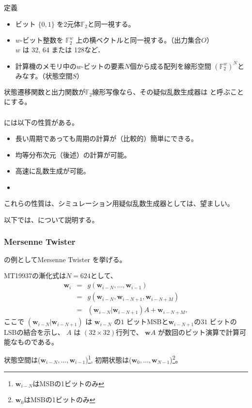 \documentclass[cjk, dvips, handout, trans, xcolor=dvipsnames, hyperref={bookmarks=false}]{beamer}
\def\F2{{\mathbb F}_2}
\def\bw{{{\mathbf w}}}
\begin{document}
\begin{frame}[t]
  \frametitle{\insertsubsection}
  \begin{block}{定義}
    \begin{itemize}
    \item ビット $\{0,1\}$ を2元体$\F2$と同一視する。
    \item $w$-ビット整数を $\F2^{w}$ 上の横ベクトルと同一視する。（出力集合$O$）\\
      $w$ は 32, 64 または 128など．
    \item 計算機のメモリ中の$w$-ビットの要素$N$個から成る配列を線形空間
      $(\F2^{w})^N$とみなす。（状態空間$S$）
    \end{itemize}
  \end{block}

  \pause
  \vspace{\baselineskip}
  状態遷移関数と出力関数が$\F2$線形写像なら、その疑似乱数生成器は
  \strong{\FLPRNG}と呼ぶことにする。
\end{frame}

\begin{frame}[t]
  \frametitle{\insertsubsection}

  \FLPRNG には以下の性質がある。
  \begin{itemize}
  \item 長い周期であっても周期の計算が（比較的）簡単にできる。
  \pause
  \item 均等分布次元（後述）の計算が可能。
  \pause
  \item 高速に乱数生成が可能。
  \pause
  \item {}
  \end{itemize}

  \pause
  これらの性質は、シミュレーション用疑似乱数生成器としては、望ましい。

  以下では、\FLPRNG について説明する。
\end{frame}

\begin{frame}[t]
  \frametitle{Mersenne Twister}

  \FLPRNG の例としてMersenne Twister を挙げる。

  MT19937の漸化式は$N = 624$として、
  \begin{eqnarray*}
    \bw_i &=& g(\bw_{i-N},\ldots,\bw_{i-1}) \\
    &=& g(\bw_{i-N}, \bw_{i-N+1}, \bw_{i-N+M})\\
    &=& (\bw_{i-N}|\bw_{i-N+1})A + \bw_{i-N+M},
  \end{eqnarray*}
  ここで $(\bw_{i-N}|\bw_{i-N+1})$ は
  $\bw_{i-N}$ の$1$ ビットMSBと$\bw_{i-N+1}$の$31$ ビットのLSBの結合を示し、
  $A$ は $(32\times 32)$行列で、
  $\bw A$ が数回のビット演算で計算可能なものである。

  \pause
  \vspace{\baselineskip}
  状態空間は($\bw_{i-N},\ldots,\bw_{i-1}$)\footnote{$\bw_{i-N}$はMSBの1ビットのみ},
  初期状態は($\bw_{0},\ldots,\bw_{N-1}$)\footnote{$\bw_{0}$はMSBの1ビットのみ}。
\end{frame}
\end{document}
